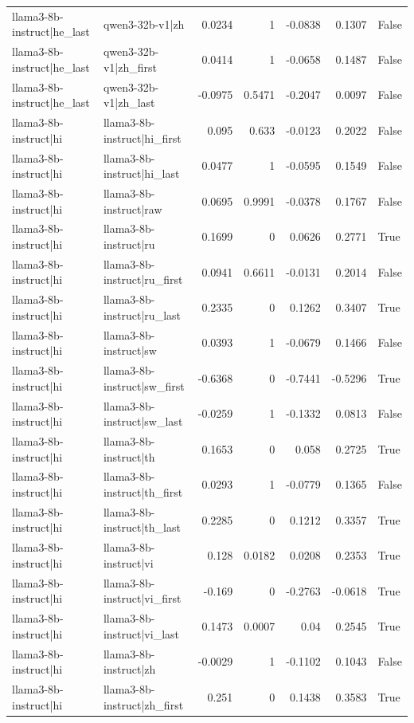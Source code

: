 \begin{table}
\begin{tabular}{l l r r r r l}
llama3-8b-instruct|he_last & qwen3-32b-v1|zh & 0.0234 & 1 & -0.0838 & 0.1307 & False \\
llama3-8b-instruct|he_last & qwen3-32b-v1|zh_first & 0.0414 & 1 & -0.0658 & 0.1487 & False \\
llama3-8b-instruct|he_last & qwen3-32b-v1|zh_last & -0.0975 & 0.5471 & -0.2047 & 0.0097 & False \\
llama3-8b-instruct|hi & llama3-8b-instruct|hi_first & 0.095 & 0.633 & -0.0123 & 0.2022 & False \\
llama3-8b-instruct|hi & llama3-8b-instruct|hi_last & 0.0477 & 1 & -0.0595 & 0.1549 & False \\
llama3-8b-instruct|hi & llama3-8b-instruct|raw & 0.0695 & 0.9991 & -0.0378 & 0.1767 & False \\
llama3-8b-instruct|hi & llama3-8b-instruct|ru & 0.1699 & 0 & 0.0626 & 0.2771 & True \\
llama3-8b-instruct|hi & llama3-8b-instruct|ru_first & 0.0941 & 0.6611 & -0.0131 & 0.2014 & False \\
llama3-8b-instruct|hi & llama3-8b-instruct|ru_last & 0.2335 & 0 & 0.1262 & 0.3407 & True \\
llama3-8b-instruct|hi & llama3-8b-instruct|sw & 0.0393 & 1 & -0.0679 & 0.1466 & False \\
llama3-8b-instruct|hi & llama3-8b-instruct|sw_first & -0.6368 & 0 & -0.7441 & -0.5296 & True \\
llama3-8b-instruct|hi & llama3-8b-instruct|sw_last & -0.0259 & 1 & -0.1332 & 0.0813 & False \\
llama3-8b-instruct|hi & llama3-8b-instruct|th & 0.1653 & 0 & 0.058 & 0.2725 & True \\
llama3-8b-instruct|hi & llama3-8b-instruct|th_first & 0.0293 & 1 & -0.0779 & 0.1365 & False \\
llama3-8b-instruct|hi & llama3-8b-instruct|th_last & 0.2285 & 0 & 0.1212 & 0.3357 & True \\
llama3-8b-instruct|hi & llama3-8b-instruct|vi & 0.128 & 0.0182 & 0.0208 & 0.2353 & True \\
llama3-8b-instruct|hi & llama3-8b-instruct|vi_first & -0.169 & 0 & -0.2763 & -0.0618 & True \\
llama3-8b-instruct|hi & llama3-8b-instruct|vi_last & 0.1473 & 0.0007 & 0.04 & 0.2545 & True \\
llama3-8b-instruct|hi & llama3-8b-instruct|zh & -0.0029 & 1 & -0.1102 & 0.1043 & False \\
llama3-8b-instruct|hi & llama3-8b-instruct|zh_first & 0.251 & 0 & 0.1438 & 0.3583 & True \\

\end{tabular}
\end{table}

